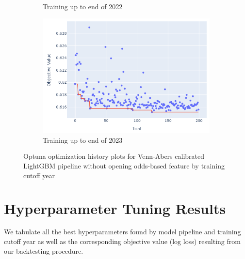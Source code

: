 \documentclass[12pt,twoside]{report}
\begin{document}
\begin{figure}[htb]
\begin{subfigure}{.33\linewidth}
  \caption{Training up to end of 2022}
\end{subfigure}%
\begin{subfigure}{.33\linewidth}
  \centering
  \includegraphics[width=0.95\linewidth]{figures/va_lightgbm_no_odds_cutoff_2023.png}
  \caption{Training up to end of 2023}
\end{subfigure}
\par\bigskip
\caption{Optuna optimization history plots for Venn-Abers calibrated LightGBM pipeline without opening odds-based feature by training cutoff year}
\end{figure}


\chapter{Hyperparameter Tuning Results}

We tabulate all the best hyperparameters found by model pipeline and training cutoff year as well as the corresponding objective value (log loss) resulting from our backtesting procedure.
\end{document}
